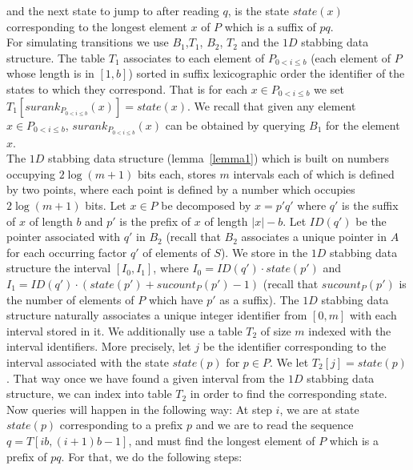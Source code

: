 \documentclass{article}
\newcommand{\?}{\mskip1.5mu}
\begin{document}
and the next state to jump to after reading $q$, is the state $state(x)$ corresponding to the longest element $x$ of $P$ which is a suffix of $pq$. 
\\
For simulating transitions we use $B_1$,$T_1$, $B_2$, $T_2$ and the $1D$ stabbing data structure. The table $T_1$ associates to each element of $P_{0<i\leq b}$ (each element of $P$ whose length is in $[1,b]$) sorted in suffix lexicographic order the identifier of the states to which they correspond. That is for each $x\in P_{0<i\leq b}$ we set $T_1[surank_{P_{0<i\leq b}}(x)]=state(x)$. We recall that given any element $x\in P_{0<i\leq b}$, $surank_{P_{0<i\leq b}}(x)$ can be obtained by querying $B_1$ for the element $x$.  
\\
The $1D$ stabbing data structure (lemma~\ref{lemma1}) which is built on numbers occupying $2\log (m+1)$ bits each, stores $m$ intervals each of which is defined by two points, where each point is defined by a number which occupies $2\log (m+1)$ bits. 
Let $x\in P$ be decomposed by $x=p'q'$ where $q'$ is the suffix of $x$ of length $b$ and $p'$ is the prefix of $x$ of length $|x|-b$. Let $ID(q')$ be the pointer associated with $q'$ in $B_2$ (recall that $B_2$ associates a unique pointer in $A$ for each occurring factor $q'$ of elements of $S$). We store in the $1D$ stabbing data structure the interval $[I_0,I_1]$, where $I_0=ID(q')\cdot state(p')$ and $I_1=ID(q')\cdot (state(p')+sucount_P(p')-1)$ (recall that $sucount_P(p')$ is the number of elements of $P$ which have $p'$ as a suffix). The $1D$ stabbing data structure naturally associates a unique integer identifier from $[0,m]$ with each interval stored in it. We additionally use a table $T_2$ of size $m$ indexed with the interval identifiers. More precisely, let $j$ be the identifier corresponding to the interval associated with the state $state(p)$ for $p\in P$. We let $T_2[j]=state(p)$. That  way once we have found a given interval from the $1D$ stabbing data structure, we can index into table $T_2$ in order to find the corresponding state. 
\\Now queries will happen in the following way: At step $i$, we are at state $state(p)$ corresponding to a prefix $p$ and we are to read the sequence $q=T[ib,(i+1)b-1]$, and must find the longest element of $P$ which is a prefix of $pq$. For that, we do the following steps:
\end{document}
